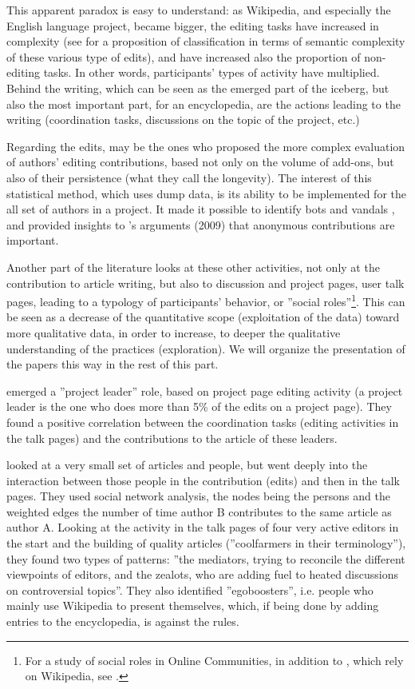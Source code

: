 This apparent paradox is easy to understand: as Wikipedia, and especially
the English language project, became bigger, the editing tasks have
increased in complexity (see \citealp{FongBiuk-Aghai10} for a proposition
of classification in terms of semantic complexity of these various
type of edits), and have increased also the proportion of non-editing
tasks. In other words, participants' types of activity have multiplied.
Behind the writing, which can be seen as the emerged part of the iceberg,
but also the most important part, for an encyclopedia, are the actions
leading to the writing (coordination tasks, discussions on the topic
of the project, etc.) 

Regarding the edits, \citet{Adleretal08a,DruckMiklauMcCallum08} may
be the ones who proposed the more complex evaluation of authors' editing
contributions, based not only on the volume of add-ons, but also of
their persistence (what they call the longevity). The interest of
this statistical method, which uses dump data, is its ability to be
implemented for the all set of authors in a project. It made it possible
to identify bots and vandals \citep{Adleretal08a}, and provided insights
to \citeauthor{AnthonySmithWilliamson09}'s arguments (2009) that
anonymous contributions are important.

Another part of the literature looks at these other activities, not
only at the contribution to article writing, but also to discussion
and project pages, user talk pages, leading to a typology of participants'
behavior, or ''social roles''\footnote{For a study of social roles in Online Communities, in addition to
\citet{Welseretal11}, which rely on Wikipedia, see \citet{Gleaveetal09}.}. This can be seen as a decrease of the quantitative scope (exploitation
of the data) toward more qualitative data, in order to increase, to
deeper the qualitative understanding of the practices (exploration).
We will organize the presentation of the papers this way in the rest
of this part.

\citet{UngDalle10} emerged a ''project leader'' role, based on
project page editing activity (a project leader is the one who does
more than 5\% of the edits on a project page). They found a positive
correlation between the coordination tasks (editing activities in
the talk pages) and the contributions to the article of these leaders. 

\citet{Ibaetal10} looked at a very small set of articles and people,
but went deeply into the interaction between those people in the contribution
(edits) and then in the talk pages. They used social network analysis,
the nodes being the persons and the weighted edges the number of time
author B contributes to the same article as author A. Looking at the
activity in the talk pages of four very active editors in the start
and the building of quality articles (''coolfarmers in their terminology''),
they found two types of patterns: ''the mediators, trying to reconcile
the different viewpoints of editors, and the zealots, who are adding
fuel to heated discussions on controversial topics''. They also identified
''egoboosters'', i.e. people who mainly use Wikipedia to present
themselves, which, if being done by adding entries to the encyclopedia,
is against the rules. 

